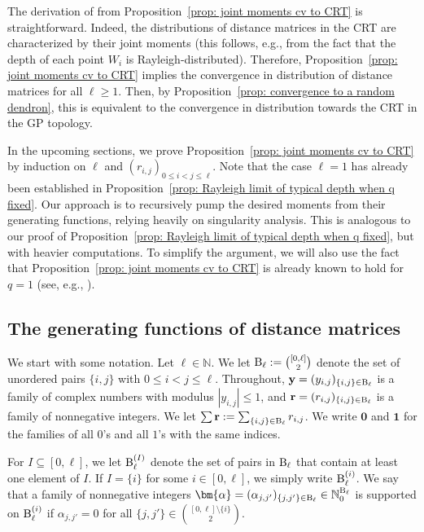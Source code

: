 \documentclass{article}
\theoremstyle{remark}
\newcommand{\bN}{\mathbb{N}}
\newcommand{\abs}[1]{{\left|#1\right|}}
\newcommand{\pairs}{{\rm B}}
\newcommand{\by}{{\mathbf{y}}}
\newcommand{\br}{{\mathbf{r}}}
\begin{document}
The derivation of  from Proposition~\ref{prop: joint moments cv to CRT} is straightforward.
Indeed, the distributions of distance matrices in the CRT are characterized by their joint moments (this follows, e.g., from the fact that the depth of each point $W_i$ is Rayleigh-distributed).
Therefore, Proposition~\ref{prop: joint moments cv to CRT} implies the convergence in distribution of distance matrices for all $\ell\ge1$.
Then, by Proposition~\ref{prop: convergence to a random dendron}, this is equivalent to the convergence in distribution towards the CRT in the GP topology.

In the upcoming sections, we prove Proposition~\ref{prop: joint moments cv to CRT} by induction on $\ell$ and $(r_{i,j})_{0\le i<j\le \ell}$.
Note that the case $\ell=1$ has already been established in Proposition~\ref{prop: Rayleigh limit of typical depth when q fixed}.
Our approach is to recursively pump the desired moments from their generating functions, relying heavily on singularity analysis.
This is analogous to our proof of Proposition~\ref{prop: Rayleigh limit of typical depth when q fixed}, but with heavier computations.
To simplify the argument, we will also use the fact that Proposition~\ref{prop: joint moments cv to CRT} is already known to hold for $q=1$ (see, e.g., \cite{Aldous_1993}).


\subsection{The generating functions of distance matrices}

We start with some notation.
Let $\ell\in\bN$.
We let $\pairs_\ell := \binom{[0,\ell]}{2}$ denote the set of unordered pairs $\{i,j\}$ with $0\le i < j\le \ell$.
Throughout, $\by = (y_{i,j})_{\{i,j\}\in \pairs_\ell}$ is a family of complex numbers with modulus $\abs{y_{i,j}}\le1$,  
and $\br = (r_{i,j})_{\{i,j\}\in \pairs_\ell}$ is a family of nonnegative integers. %
We let $\sum \br := \sum_{\{i,j\}\in \pairs_\ell} r_{i,j}$.
We write $\bm{0}$ and $\bm{1}$ for the families of all $0$'s and all $1$'s with the same indices.

For $I\subseteq [0,\ell]$, we let $\pairs_\ell^{(I)}$ denote the set of pairs in $\pairs_\ell$ that contain at least one element of $I$.
If $I=\{i\}$ for some $i\in[0,\ell]$, we simply write $\pairs_\ell^{(i)}$.
We say that a family of nonnegative integers $\bm{\alpha} = (\alpha_{j,j'})_{\{j,j'\}\in \pairs_\ell} \in \bN_0^{\pairs_\ell}$ is supported on $\pairs_\ell^{(i)}$ if $\alpha_{j,j'}=0$ for all $\{j,j'\} \in \binom{[0,\ell] \setminus \{i\}}{2}$.
\end{document}

